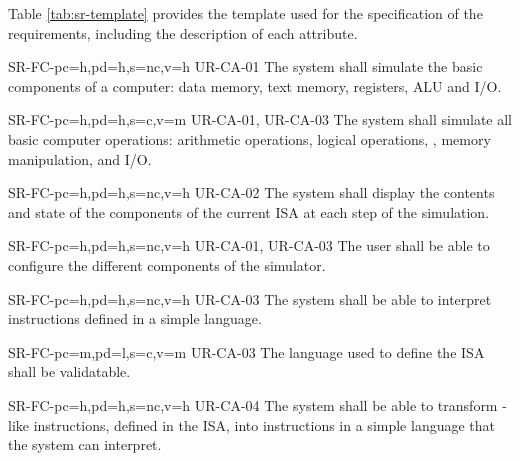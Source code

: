 Table \ref{tab:sr-template} provides the template used for the specification of the requirements, including the description of each attribute.



\setcounter{i}{1}

\begin{softwareReq}{SR-FC-}{pc=h,pd=h,s=nc,v=h}
  {UR-CA-01}
  The system shall simulate the basic components of a computer: \gls{data memory}, \gls{text memory}, \glspl{register}, \gls{ALU} and \gls{I/O}.
\end{softwareReq}

\begin{softwareReq}{SR-FC-}{pc=h,pd=h,s=c,v=m}
  {UR-CA-01, UR-CA-03}
  The system shall simulate all basic computer operations: \glspl{arithmetic operation}, \glspl{logical operation}, , \gls{memory} manipulation, and \gls{I/O}.
\end{softwareReq}

\begin{softwareReq}{SR-FC-}{pc=h,pd=h,s=nc,v=h}
  {UR-CA-02}
  The system shall display the contents and state of the components of the current \gls{ISA} at each step of the simulation.
\end{softwareReq}

\begin{softwareReq}{SR-FC-}{pc=h,pd=h,s=nc,v=h}
  {UR-CA-01, UR-CA-03}
  The user shall be able to configure the different components of the simulator.
\end{softwareReq}

\begin{softwareReq}{SR-FC-}{pc=h,pd=h,s=nc,v=h}
  {UR-CA-03}
  The system shall be able to interpret instructions defined in a simple language.
\end{softwareReq}

\begin{softwareReq}{SR-FC-}{pc=m,pd=l,s=c,v=m}
  {UR-CA-03}
  The language used to define the \gls{ISA} shall be validatable.
\end{softwareReq}

\begin{softwareReq}{SR-FC-}{pc=h,pd=h,s=nc,v=h}
  {UR-CA-04}
  The system shall be able to transform -like instructions, defined in the \gls{ISA}, into instructions in a simple language that the system can interpret.
\end{softwareReq}

